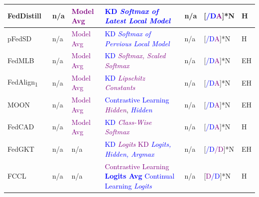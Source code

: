\begin{table}[htp]
\begin{longtable}{|p{1.68cm}|p{1.2cm}|p{1.25cm}|p{5.0cm}|p{2.59cm}|p{1.2cm}|p{0.35cm}|}
    FedDistill~\cite{jiang2020federated} & n/a & \textcolor{purple}{Model Avg} & \textcolor{blue}{KD \textit{Softmax of Latest Local Model}} & n/a &[\textcolor{blue}{/D}\textcolor{purple}{A}]*N & H \\ \hline %

    \rowcolor[gray]{.9}
    pFedSD~\cite{jin2022personalized} & n/a & \textcolor{purple}{Model Avg} & \textcolor{blue}{KD \textit{Softmax of Pervious Local Model}} & n/a &[\textcolor{blue}{/D}\textcolor{purple}{A}]*N & H \\ \hline

    FedMLB~\cite{kim2022multi} & n/a & \textcolor{purple}{Model Avg} &\textcolor{blue}{KD} \textcolor{purple}{\textit{Softmax, Scaled Softmax}} & n/a & [\textcolor{blue}{/D}\textcolor{purple}{A}]*N & EH \\ \hline %

    \rowcolor[gray]{.9}
    FedAlign\textsubscript{1}~\cite{mendieta2022local} & n/a &\textcolor{purple}{Model Avg}&\textcolor{blue}{KD}  \textcolor{purple}{\textit{Lipschitz Constants}}~\cite{shang2021lipschitz} & n/a & [\textcolor{blue}{/D}\textcolor{purple}{A}]*N & EH \\ \hline %
    
    MOON~\cite{li2021model} & n/a & \textcolor{purple}{Model Avg} & \textcolor{blue}{Contrastive Learning} \textcolor{purple}{\textit{Hidden}}, \textcolor{blue}{\textit{Hidden}} & n/a &[\textcolor{blue}{/D}\textcolor{purple}{A}]*N & EH \\ \hline %

    \rowcolor[gray]{.9}
    FedCAD~\cite{he2022class} & n/a & \textcolor{purple}{Model Avg} & \textcolor{blue}{KD} \textcolor{purple}{\textit{Class-Wise Softmax}} & n/a & [\textcolor{blue}{/D}\textcolor{purple}{A}]*N & H \\ \hline %

    FedGKT~\cite{he2020group} & n/a & n/a & \textcolor{blue}{KD} \textcolor{purple}{\textit{Logits}} \textcolor{purple}{KD} \textcolor{blue}{\textit{Logits, Hidden, Argmax}} & n/a & [\textcolor{blue}{/D}\textcolor{purple}{/D}]*N & EH \\ \hline

    \rowcolor[gray]{.9}
    FCCL~\cite{huang2022learn} & n/a & n/a & \textcolor{purple}{Contrastive Learning} \textcolor{blue}{\textbf{Logits Avg}} \textcolor{blue}{Continual Learning} \textcolor{blue}{\textit{Logits}} & n/a & [\textcolor{purple}{D}\textcolor{blue}{/D}]*N & H \\ \hline %


\end{longtable}
\end{table}
